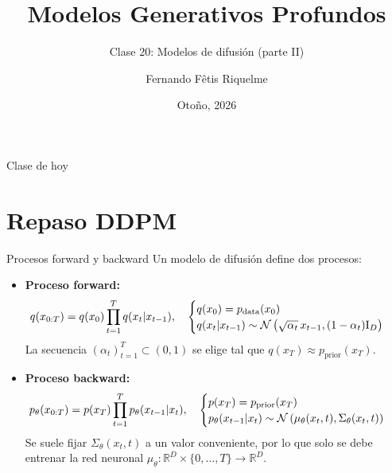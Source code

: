 \documentclass{beamer}
\title{Modelos Generativos Profundos}
\subtitle{Clase 20: Modelos de difusión (parte II)}
\author{Fernando Fêtis Riquelme}
\institute{
    Facultad de Ciencias Físicas y Matemáticas\\
    Universidad de Chile
}
\date{Otoño, 2026}
\newcommand{\R}{\mathbb{R}}
\begin{document}
\begin{frame}
    \titlepage
\end{frame}

\begin{frame}{Clase de hoy}
    \tableofcontents
\end{frame}

\section{Repaso DDPM}

\begin{frame}{Procesos forward y backward}
    Un modelo de difusión define dos procesos:
    \begin{itemize}
        \item \textbf{Proceso forward:}
              \begin{equation*}
                  \hspace{-0.2cm}
                  q(x_{0:T})=q(x_0)\prod_{t=1}^T q(x_t|x_{t-1}),
                  \quad
                  \begin{cases}
                      q(x_0)=p_\text{data}(x_0) \\
                      q(x_t|x_{t-1})\sim\mathcal{N}\left(\sqrt{\alpha_t}\,x_{t-1},(1-\alpha_t)\text{I}_D\right)
                  \end{cases}
              \end{equation*}
              La secuencia $(\alpha_t)_{t=1}^T\subset(0,1)$ se elige tal que $q(x_T)\approx p_{\text{prior}}(x_T)$.
        \item \textbf{Proceso backward:}
              \begin{equation*}
                  \hspace{-0.2cm}
                  p_\theta(x_{0:T})=p(x_T)\prod_{t=1}^T p_\theta(x_{t-1}|x_t),
                  \quad
                  \begin{cases}
                      p(x_T)=p_{\text{prior}}(x_T) \\
                      p_\theta(x_{t-1}|x_t)\sim\mathcal{N}\left(\mu_\theta(x_t,t),\Sigma_\theta(x_t,t)\right)
                  \end{cases}
              \end{equation*}
              Se suele fijar $\Sigma_\theta(x_t,t)$ a un valor conveniente, por lo que solo se debe entrenar la red neuronal $\mu_\theta:\R^D\times\{0,\ldots,T\}\to\R^D$.
    \end{itemize}
\end{frame}
\end{document}
